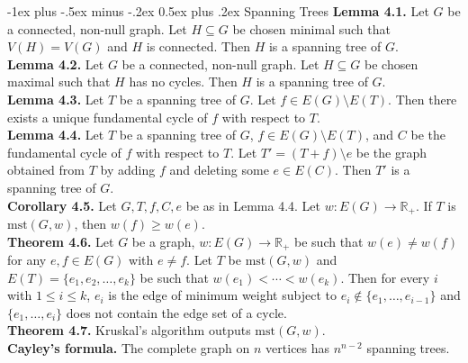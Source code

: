 \documentclass[10pt,landscape]{article}
\makeatletter
\renewcommand{\section}{\@startsection{section}{1}{0mm}%
                                {-1ex plus -.5ex minus -.2ex}%
                                {0.5ex plus .2ex}%
                                {\normalfont\large\bfseries}}
\makeatother
\begin{document}
\begin{multicols}{3}
\section{Spanning Trees}
\textbf{Lemma 4.1.} Let \( G \) be a connected, non-null graph. Let \( H \subseteq G \) be chosen minimal such that \( V(H) = V(G) \) and \( H \) is connected. Then \( H \) is a spanning tree of \( G \). \\
\textbf{Lemma 4.2.} Let \( G \) be a connected, non-null graph. Let \( H \subseteq G	\) be chosen maximal such that \( H \) has no cycles. Then \( H \) is a spanning tree of \( G \). \\
\textbf{Lemma 4.3.} Let \( T \) be a spanning tree of \( G \). Let \( f \in E(G) \setminus E(T) \). Then there exists a unique fundamental cycle of \( f \) with respect to \( T \). \\
\textbf{Lemma 4.4.} Let \( T \) be a spanning tree of \( G \), \( f \in E(G) \setminus E(T) \), and \( C \) be the fundamental cycle of \( f \) with respect to \( T \). Let \( T' = (T+f) \setminus e \) be the graph obtained from \( T \) by adding \( f \) and deleting some \( e \in E(C). \) Then \( T' \) is a spanning tree of \( G \). \\
\textbf{Corollary 4.5.} Let \( G,T,f,C,e \) be as in Lemma 4.4. Let \( w : E(G) \to \mathbb{R}_+ \). If \( T \) is \( \mbox{mst}(G,w) \), then \( w(f) \geq w(e). \) \\
\textbf{Theorem 4.6.} Let \( G \) be a graph, \( w :E(G) \to \mathbb{R}_+ \) be such that \( w(e) \neq w(f) \) for any \( e,f \in E(G) \) with \( e \neq f \). Let \( T \) be \( \mbox{mst}(G,w) \) and \( E(T) = \{ e_1,e_2,\hdots ,e_k \}  \) be such that \( w(e_1) < \cdots < w(e_k) \). Then for every \( i \) with \( 1 \leq i \leq k \), \( e_i \) is the edge of minimum weight subject to \( e_i \notin \{ e_1, \hdots , e_{i-1}  \}  \) and \( \{ e_1, \hdots , e_i \} \) does not contain the edge set of a cycle. \\
\textbf{Theorem 4.7.} Kruskal's algorithm outputs \( \mbox{mst}(G,w) \). \\
\textbf{Cayley's formula.} The complete graph on \( n \) vertices has \( n^{n-2}  \) spanning trees. 

\end{multicols}
\end{document}
